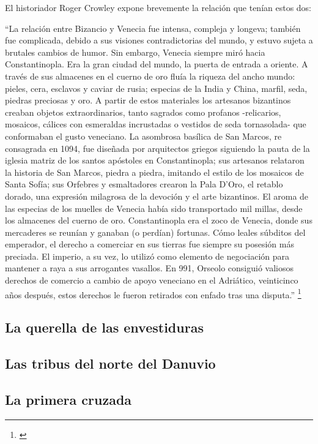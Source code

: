 El historiador Roger Crowley expone brevemente la relación 
que tenían estos dos:

“La relación entre Bizancio y Venecia fue intensa, compleja y longeva; 
también fue complicada, debido a sus visiones contradictorias del mundo, 
y estuvo sujeta a brutales cambios de humor. Sin embargo, Venecia siempre 
miró hacia Constantinopla. Era la gran ciudad del mundo, la puerta de 
entrada a oriente. A través de sus almacenes en el cuerno de oro fluía 
la riqueza del ancho mundo: pieles, cera, esclavos y caviar de rusia; 
especias de la India y China, marfil, seda, piedras preciosas y oro. 
A partir de estos materiales los artesanos bizantinos creaban objetos 
extraordinarios, tanto sagrados como profanos -relicarios, mosaicos, 
cálices con esmeraldas incrustadas o vestidos de seda tornasolada- 
que conformaban el gusto veneciano. La asombrosa basílica de San Marcos, 
re consagrada en 1094, fue diseñada por arquitectos griegos siguiendo la 
pauta de la iglesia matriz de los santos apóstoles en Constantinopla; 
sus artesanos relataron la historia de San Marcos, piedra a piedra, 
imitando el estilo de los mosaicos de Santa Sofía; sus Orfebres y 
esmaltadores crearon la Pala D’Oro, el retablo dorado, una expresión 
milagrosa de la devoción y el arte bizantinos. 
El aroma de las especias de los muelles de Venecia había sido 
transportado mil millas, desde los almacenes del cuerno de oro. 
Constantinopla era el zoco de Venecia, donde sus mercaderes se reunían y
 ganaban (o perdían) fortunas. Cómo leales súbditos del emperador, 
 el derecho a comerciar en sus tierras fue siempre su posesión 
 más preciada. El imperio, a su vez, lo utilizó como elemento de 
 negociación para mantener a raya a sus arrogantes vasallos. 
 En 991, Orseolo consiguió valiosos derechos de comercio a cambio 
 de apoyo veneciano en el Adriático, veinticinco años después, 
 estos derechos le fueron retirados con enfado tras una disputa.”
 \footnote{\cite[pp.~39--40]{venecia}}


\subsection{La querella de las envestiduras}

\subsection{Las tribus del norte del Danuvio}

\subsection{La primera cruzada}